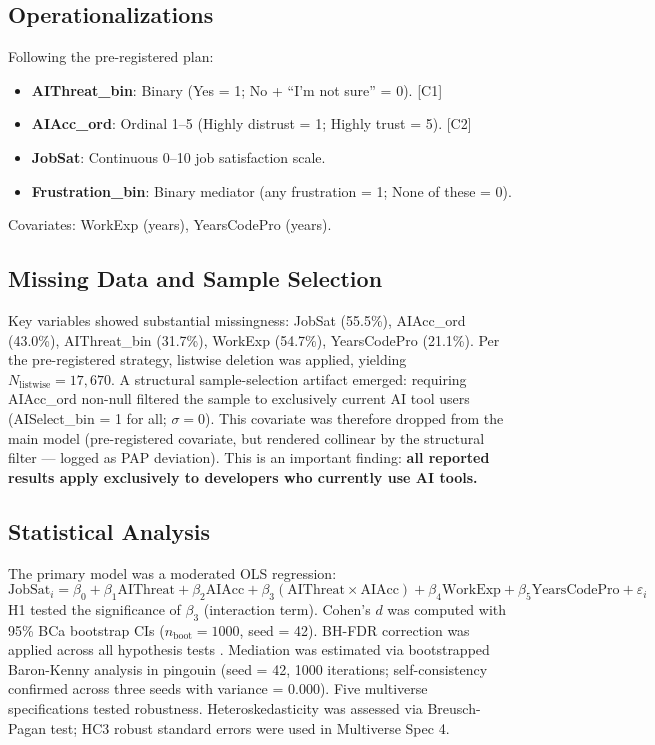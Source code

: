 \documentclass[11pt]{article}
\begin{document}
\subsection{Operationalizations}
Following the pre-registered plan:
\begin{itemize}
  \item \textbf{AIThreat\_bin}: Binary (Yes = 1; No + ``I'm not sure'' = 0). [C1]
  \item \textbf{AIAcc\_ord}: Ordinal 1--5 (Highly distrust = 1; Highly trust = 5). [C2]
  \item \textbf{JobSat}: Continuous 0--10 job satisfaction scale.
  \item \textbf{Frustration\_bin}: Binary mediator (any frustration = 1; None of these = 0).
\end{itemize}
Covariates: WorkExp (years), YearsCodePro (years).

\subsection{Missing Data and Sample Selection}
Key variables showed substantial missingness: JobSat (55.5\%), AIAcc\_ord (43.0\%),
AIThreat\_bin (31.7\%), WorkExp (54.7\%), YearsCodePro (21.1\%). Per the pre-registered
strategy, listwise deletion was applied, yielding $N_{\text{listwise}} = 17{,}670$.
A structural sample-selection artifact emerged: requiring AIAcc\_ord non-null
filtered the sample to exclusively current AI tool users (AISelect\_bin = 1 for all;
$\sigma = 0$). This covariate was therefore dropped from the main model (pre-registered
covariate, but rendered collinear by the structural filter --- logged as PAP deviation).
This is an important finding: \textbf{all reported results apply exclusively to
developers who currently use AI tools.}

\subsection{Statistical Analysis}
The primary model was a moderated OLS regression:
\begin{equation}
  \text{JobSat}_i = \beta_0 + \beta_1 \text{AIThreat} + \beta_2 \text{AIAcc}
    + \beta_3 (\text{AIThreat} \times \text{AIAcc})
    + \beta_4 \text{WorkExp} + \beta_5 \text{YearsCodePro} + \varepsilon_i
\end{equation}
H1 tested the significance of $\beta_3$ (interaction term). Cohen's $d$ was
computed with 95\% BCa bootstrap CIs ($n_{\text{boot}} = 1000$, seed = 42).
BH-FDR correction was applied across all hypothesis tests
\citep{benjamini1995controlling}. Mediation was estimated via bootstrapped
Baron-Kenny analysis in pingouin (seed = 42, 1000 iterations; self-consistency
confirmed across three seeds with variance = 0.000). Five multiverse specifications
tested robustness. Heteroskedasticity was assessed via Breusch-Pagan test;
HC3 robust standard errors were used in Multiverse Spec 4.
\end{document}
